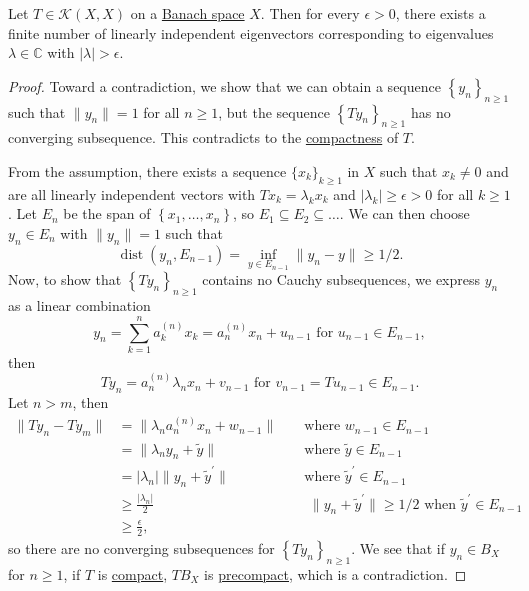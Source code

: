 \begin{theorem}\label{thm:point-spectrum-of-compact-op}
	Let \(T\in \mathcal{K} (X, X)\) on a \hyperref[def:Banach-space]{Banach space} \(X\). Then for every \(\epsilon > 0\), there exists a finite number of linearly independent eigenvectors corresponding to eigenvalues \(\lambda \in \mathbb{C} \) with \(\vert \lambda  \vert > \epsilon \).
\end{theorem}
\begin{proof}
	Toward a contradiction, we show that we can obtain a sequence \(\left\{ y_n \right\} _{n\geq 1}\) such that \(\lVert y_n \rVert = 1\) for all \(n\geq 1\), but the sequence \(\left\{ Ty_n \right\} _{n\geq 1}\) has no converging subsequence. This contradicts to the \hyperref[def:compact-op]{compactness} of \(T\).

	From the assumption, there exists a sequence \(\{x_k\}_{k\geq 1}\) in \(X\) such that \(x_k \neq 0\) and are all linearly independent vectors with \(Tx_k = \lambda _k x_k\) and \(\vert \lambda _k \vert \geq \epsilon > 0\) for all \(k\geq 1\). Let \(E_n\) be the span of \(\left\{ x_1, \ldots , x_n \right\}\), so \(E_1 \subseteq E_2 \subseteq \ldots \). We can then choose \(y_n \in E_n\) with \(\lVert y_n \rVert = 1\) such that
	\[
		\mathop{\mathrm{dist}}(y_n, E_{n-1}) = \inf _{y\in E_{n-1}} \lVert y_n - y \rVert \geq 1 / 2.
	\]
	Now, to show that \(\left\{ Ty_n \right\} _{n\geq 1}\) contains no Cauchy subsequences, we express \(y_n\) as a linear combination
	\[
		y_n = \sum_{k=1}^{n} a_k^{(n)} x_k = a_n ^{(n)} x_n + u_{n-1} \text{ for \(u_{n-1} \in E_{n-1}\)} ,
	\]
	then
	\[
		Ty_n = a_n^{(n)} \lambda _n x_n + v_{n-1} \text{ for \(v_{n-1} = Tu_{n-1}\in E_{n-1}\)}.
	\]
	Let \(n > m\), then
	\[
		\begin{aligned}
			\lVert Ty_n - Ty_m \rVert
			 & = \lVert \lambda _n a_n ^{(n)} x_n + w_{n-1}\rVert                 &  & \text{ where \(w_{n-1} \in E_{n-1}\)}                                                                       \\
			 & = \lVert \lambda _n y_n + \widetilde{y}  \rVert                    &  & \text{ where \(\widetilde{y} \in E_{n-1}\)}                                                                 \\
			 & = \vert \lambda _n \vert \lVert y_n + \widetilde{y} ^\prime \rVert &  & \text{ where \(\widetilde{y} ^\prime \in E_{n-1}\)}                                                         \\
			 & \geq \frac{\vert \lambda _n \vert }{2}                             &  & \text{ \(\lVert y_n + \widetilde{y} ^\prime  \rVert \geq 1 / 2\) when \(\widetilde{y}^\prime \in E_{n-1}\)} \\
			 & \geq \frac{\epsilon}{2},
		\end{aligned}
	\]
	so there are no converging subsequences for \(\left\{ Ty_n \right\} _{n\geq 1}\). We see that if \(y_n\in B_X\) for \(n\geq 1\), if \(T\) is \hyperref[def:compact-op]{compact}, \(TB_X\) is \hyperref[def:precompact]{precompact}, which is a contradiction.
\end{proof}

